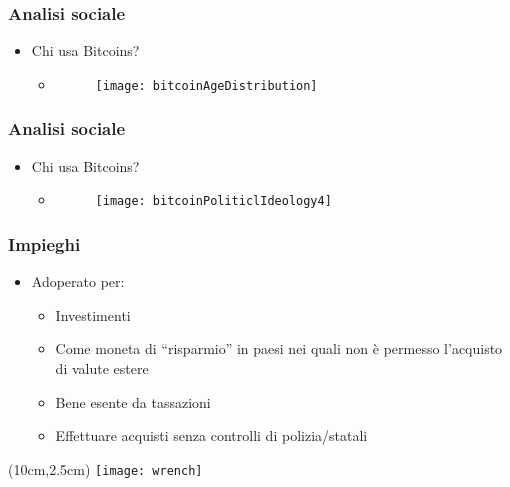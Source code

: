 \begin{frame}
 \frametitle{Analisi sociale}

 \begin{itemize}
  \item Chi usa Bitcoins?
  \begin{itemize}
   \item[]
   \begin{figure}
    \centering
    \texttt{[image: bitcoinAgeDistribution]}
   \end{figure}

  \end{itemize}

 \end{itemize}

\end{frame}


\begin{frame}
 \frametitle{Analisi sociale}

 \begin{itemize}
  \item Chi usa Bitcoins?
  \begin{itemize}
   \item[]
   \begin{figure}
    \centering
    \texttt{[image: bitcoinPoliticlIdeology4]}
   \end{figure}

  \end{itemize}

 \end{itemize}

\end{frame}


\begin{frame}
 \frametitle{Impieghi}

 \begin{itemize}
  \item<1-> Adoperato per:
  \begin{itemize}
   \item<2-> Investimenti
   \item<3-> Come moneta di ``risparmio'' in paesi nei quali non \`e permesso
l'acquisto di valute estere
   \item<4-> Bene esente da tassazioni
   \item<5-> Effettuare acquisti senza controlli di polizia/statali
  \end{itemize}

 \end{itemize}


 \begin{textblock*}{5cm}(10cm,2.5cm)
  \texttt{[image: wrench]}
 \end{textblock*}

\end{frame}
